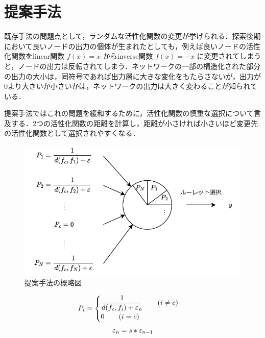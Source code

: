 \section{提案手法}
既存手法の問題点として，ランダムな活性化関数の変更が挙げられる．探索後期において良いノードの出力の個体が生まれたとしても，例えば良いノードの活性化関数をlinear関数 $ f(x) = x $ からinverse関数 $ f(x) = -x $ に変更されてしまうと，ノードの出力は反転されてしまう．ネットワークの一部の構造化された部分の出力の大小は，同符号であれば出力層に大きな変化をもたらさないが，出力が0より大きいか小さいかは，ネットワークの出力は大きく変わることが知られている\cite{WANN}．

提案手法ではこれの問題を緩和するために，活性化関数の慎重な選択について言及する．2つの活性化関数の距離を計算し，距離が小さければ小さいほど変更先の活性化関数として選択されやすくなる．

\begin{figure}[h]
    \begin{center}
        \includegraphics[scale=0.8]{img/exppropose.pdf}
        \caption{提案手法の概略図}
    \end{center}
\end{figure}

\begin{equation}
    P_{i} =  \begin{cases} \dfrac{1}{d(f_{c}, f_{i}) + \varepsilon_{n} } \qquad (i \neq c) \\ 0 \qquad (i = c) \end{cases}\\
\end{equation}
\begin{equation}
    \varepsilon_{n} = s * \varepsilon_{n-1} \\
\end{equation}


